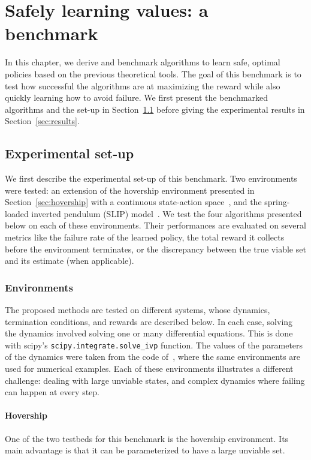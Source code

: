 \chapter{Safely learning values: a benchmark} \label{chap:benchmark}
In this chapter, we derive and benchmark algorithms to learn safe, optimal policies based on the previous theoretical tools. The goal of this benchmark is to test how successful the algorithms are at maximizing the reward while also quickly learning how to avoid failure. We first present the benchmarked algorithms and the set-up in Section~\ref{sec:set-up} before giving the experimental results in Section~\ref{sec:results}.

\section{Experimental set-up} \label{sec:set-up}
We first describe the experimental set-up of this benchmark. Two environments were tested: an extension of the hovership environment presented in Section~\ref{sec:hovership} with a continuous state-action space~\cite{heim2020learnable}, and the spring-loaded inverted pendulum (SLIP) model~\cite{heim2019beyond}. We test the four algorithms presented below on each of these environments. Their performances are evaluated on several metrics like the failure rate of the learned policy, the total reward it collects before the environment terminates, or the discrepancy between the true viable set and its estimate (when applicable).

\subsection{Environments}
The proposed methods are tested on different systems, whose dynamics, termination conditions, and rewards are described below. In each case, solving the dynamics involved solving one or many differential equations. This is done with scipy's \verb|scipy.integrate.solve_ivp| function. The values of the parameters of the dynamics were taken from the code of~\textcite{heim2020learnable}, where the same environments are used for numerical examples. Each of these environments illustrates a different challenge: dealing with large unviable states, and complex dynamics where failing can happen at every step.

\subsubsection{Hovership}
One of the two testbeds for this benchmark is the hovership environment. Its main advantage is that it can be parameterized to have a large unviable set.

